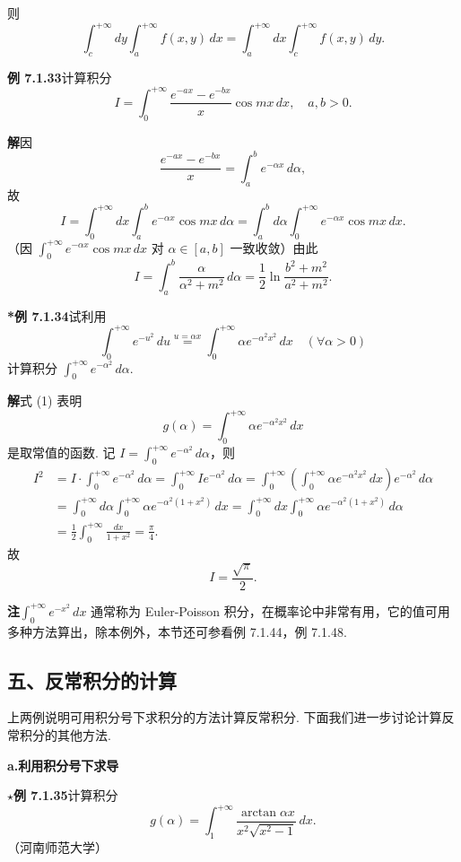 \documentclass[UTF8,12pt,a4paper,fontset=fandol]{ctexart}
\begin{document}
则
\[
\int_c^{+\infty}dy\int_a^{+\infty}f(x,y)\,dx
=\int_a^{+\infty}dx\int_c^{+\infty}f(x,y)\,dy.
\]

\noindent\textbf{例 7.1.33}\quad 计算积分
\[
I=\int_0^{+\infty}\frac{e^{-ax}-e^{-bx}}x\cos mx\,dx,\quad a,b>0.
\]

\noindent\textbf{解}\quad 因
\[
\frac{e^{-ax}-e^{-bx}}x=\int_a^b e^{-\alpha x}\,d\alpha,
\]
故
\[
I=\int_0^{+\infty}dx\int_a^b e^{-\alpha x}\cos mx\,d\alpha
=\int_a^b d\alpha\int_0^{+\infty}e^{-\alpha x}\cos mx\,dx.
\]
（因 $\displaystyle\int_0^{+\infty}e^{-\alpha x}\cos mx\,dx$ 对 $\alpha\in[a,b]$ 一致收敛）由此
\[
I=\int_a^b\frac{\alpha}{\alpha^2+m^2}\,d\alpha
=\frac12\ln\frac{b^2+m^2}{a^2+m^2}.
\]

\noindent\textbf{*例 7.1.34}\quad 试利用
\[
\int_0^{+\infty}e^{-u^2}\,du
\overset{u=\alpha x}{=}\int_0^{+\infty}\alpha e^{-\alpha^2x^2}\,dx\quad(\forall\alpha>0)
\tag{1}
\]
计算积分 $\displaystyle\int_0^{+\infty}e^{-\alpha^2}\,d\alpha$.

\noindent\textbf{解}\quad 式 (1) 表明
\[
g(\alpha)=\int_0^{+\infty}\alpha e^{-\alpha^2x^2}\,dx
\]
是取常值的函数. 记 $I=\displaystyle\int_0^{+\infty}e^{-\alpha^2}\,d\alpha$，则
\[
\begin{aligned}
I^2
&=I\cdot\int_0^{+\infty}e^{-\alpha^2}\,d\alpha
=\int_0^{+\infty}Ie^{-\alpha^2}\,d\alpha
=\int_0^{+\infty}\left(\int_0^{+\infty}\alpha e^{-\alpha^2x^2}\,dx\right)e^{-\alpha^2}\,d\alpha\\
&=\int_0^{+\infty}d\alpha\int_0^{+\infty}\alpha e^{-\alpha^2(1+x^2)}\,dx
=\int_0^{+\infty}dx\int_0^{+\infty}\alpha e^{-\alpha^2(1+x^2)}\,d\alpha\\
&=\frac12\int_0^{+\infty}\frac{dx}{1+x^2}
=\frac{\pi}{4}.
\end{aligned}
\]
故
\[
I=\frac{\sqrt\pi}{2}.
\]

\noindent\textbf{注}\quad $\displaystyle\int_0^{+\infty}e^{-x^2}\,dx$ 通常称为 Euler-Poisson 积分，在概率论中非常有用，它的值可用多种方法算出，除本例外，本节还可参看例 7.1.44，例 7.1.48.

\subsection*{五、反常积分的计算}

上两例说明可用积分号下求积分的方法计算反常积分. 下面我们进一步讨论计算反常积分的其他方法.

\noindent\textbf{a.\quad 利用积分号下求导}

\noindent\textbf{$\star$例 7.1.35}\quad 计算积分
\[
g(\alpha)=\int_1^{+\infty}\frac{\arctan\alpha x}{x^2\sqrt{x^2-1}}\,dx.
\]
（河南师范大学）
\end{document}
